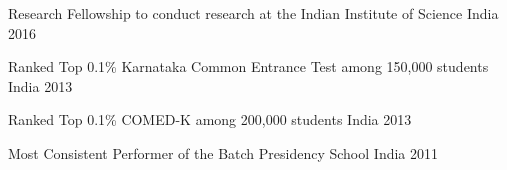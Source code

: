 \begin{cvhonors}
  \cvhonor
    {Research Fellowship} %
    {to conduct research at the Indian Institute of Science} %
    {India} %
    {2016} %

  \cvhonor
    {Ranked Top 0.1\%} %
    {Karnataka Common Entrance Test among 150,000 students} %
    {India} %
    {2013} %

  \cvhonor
    {Ranked Top 0.1\%} %
    {COMED-K among 200,000 students} %
    {India} %
    {2013} %
    
  \cvhonor
    {Most Consistent Performer of the Batch} %
    {Presidency School} %
    {India} %
    {2011} %

\end{cvhonors}


